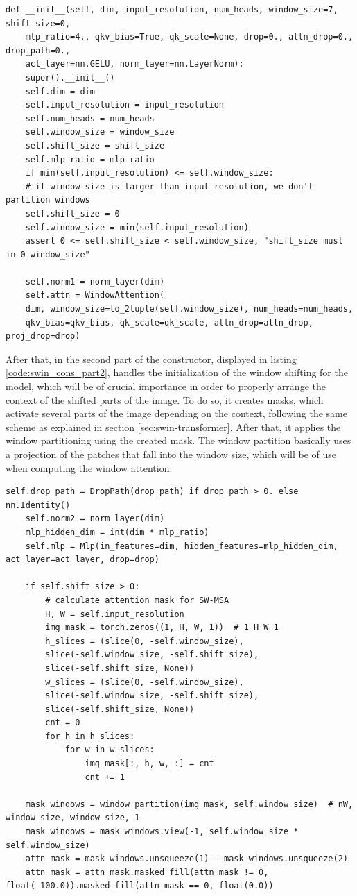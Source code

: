 \begin{lstlisting}[caption={First part of the SWIN block constructor}, label={code:swin_cons_part1}]
def __init__(self, dim, input_resolution, num_heads, window_size=7, shift_size=0,
	mlp_ratio=4., qkv_bias=True, qk_scale=None, drop=0., attn_drop=0., drop_path=0.,
	act_layer=nn.GELU, norm_layer=nn.LayerNorm):
	super().__init__()
	self.dim = dim
	self.input_resolution = input_resolution
	self.num_heads = num_heads
	self.window_size = window_size
	self.shift_size = shift_size
	self.mlp_ratio = mlp_ratio
	if min(self.input_resolution) <= self.window_size:
	# if window size is larger than input resolution, we don't partition windows
	self.shift_size = 0
	self.window_size = min(self.input_resolution)
	assert 0 <= self.shift_size < self.window_size, "shift_size must in 0-window_size"
	
	self.norm1 = norm_layer(dim)
	self.attn = WindowAttention(
	dim, window_size=to_2tuple(self.window_size), num_heads=num_heads,
	qkv_bias=qkv_bias, qk_scale=qk_scale, attn_drop=attn_drop, proj_drop=drop)
\end{lstlisting}

After that, in the second part of the constructor, displayed in listing \ref{code:swin_cons_part2}, handles the initialization of the window shifting for the  model, which will be of crucial importance in order to properly arrange the context of the shifted parts of the image. To do so, it creates masks, which activate several parts of the image depending on the context, following the same scheme as explained in section \ref{sec:swin-transformer}. After that, it applies the window partitioning using the created mask. The window partition basically uses a projection of the patches that fall into the window size, which will be of use when computing the window attention.

\begin{lstlisting}[caption={Second part of the SWIN block model}, label={code:swin_cons_part2}]
	self.drop_path = DropPath(drop_path) if drop_path > 0. else nn.Identity()
	self.norm2 = norm_layer(dim)
	mlp_hidden_dim = int(dim * mlp_ratio)
	self.mlp = Mlp(in_features=dim, hidden_features=mlp_hidden_dim, act_layer=act_layer, drop=drop)
	
	if self.shift_size > 0:
		# calculate attention mask for SW-MSA
		H, W = self.input_resolution
		img_mask = torch.zeros((1, H, W, 1))  # 1 H W 1
		h_slices = (slice(0, -self.window_size),
		slice(-self.window_size, -self.shift_size),
		slice(-self.shift_size, None))
		w_slices = (slice(0, -self.window_size),
		slice(-self.window_size, -self.shift_size),
		slice(-self.shift_size, None))
		cnt = 0
		for h in h_slices:
			for w in w_slices:
				img_mask[:, h, w, :] = cnt
				cnt += 1
	
	mask_windows = window_partition(img_mask, self.window_size)  # nW, window_size, window_size, 1
	mask_windows = mask_windows.view(-1, self.window_size * self.window_size)
	attn_mask = mask_windows.unsqueeze(1) - mask_windows.unsqueeze(2)
	attn_mask = attn_mask.masked_fill(attn_mask != 0, float(-100.0)).masked_fill(attn_mask == 0, float(0.0))
\end{lstlisting}


